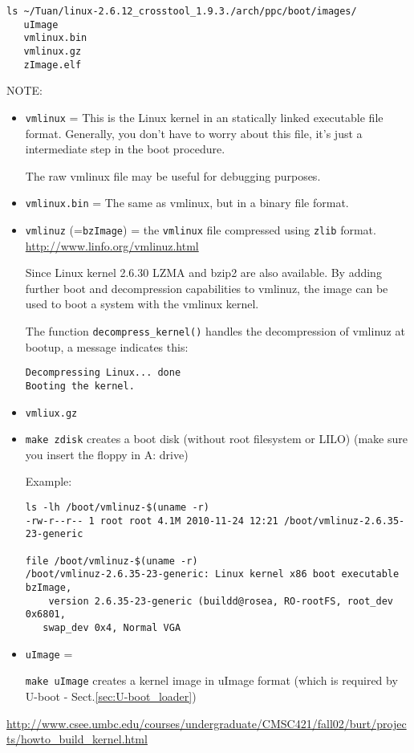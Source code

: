 \begin{verbatim}
ls ~/Tuan/linux-2.6.12_crosstool_1.9.3./arch/ppc/boot/images/
   uImage
   vmlinux.bin
   vmlinux.gz
   zImage.elf
\end{verbatim}


NOTE: 
\begin{itemize}
  \item \verb!vmlinux! = This is the Linux kernel in an statically linked
  executable file format. Generally, you don't have to worry about this file,
  it's just a intermediate step in the boot procedure.
  
  The raw vmlinux file may be useful for debugging purposes.
  
  \item \verb!vmlinux.bin! = The same as vmlinux, but in a binary file format.
  
  \item \verb!vmlinuz! (=\verb!bzImage!) = the \verb!vmlinux! file compressed
  using \verb!zlib! format. 
\url{http://www.linfo.org/vmlinuz.html}
  
  
  Since Linux kernel 2.6.30 LZMA and bzip2 are also available.
  By adding further boot and decompression capabilities to vmlinuz, the image
  can be used to boot a system with the vmlinux kernel. 
  
  The function \verb!decompress_kernel()! handles the decompression of vmlinuz
  at bootup, a message indicates this:
  \begin{verbatim}
Decompressing Linux... done
Booting the kernel.
  \end{verbatim}
  
  \item \verb!vmliux.gz!
  
  
  \item \verb!make zdisk! creates a boot disk (without root filesystem or LILO)
  (make sure you insert the floppy in A: drive)
  

Example: 
\begin{verbatim}
ls -lh /boot/vmlinuz-$(uname -r)
-rw-r--r-- 1 root root 4.1M 2010-11-24 12:21 /boot/vmlinuz-2.6.35-23-generic

file /boot/vmlinuz-$(uname -r)
/boot/vmlinuz-2.6.35-23-generic: Linux kernel x86 boot executable bzImage, 
    version 2.6.35-23-generic (buildd@rosea, RO-rootFS, root_dev 0x6801,
   swap_dev 0x4, Normal VGA
\end{verbatim}  
  
  \item \verb!uImage! = 
  
  \verb!make uImage! creates a kernel image in uImage
  format (which is required by U-boot - Sect.\ref{sec:U-boot_loader})
  
  
\end{itemize}
\url{http://www.csee.umbc.edu/courses/undergraduate/CMSC421/fall02/burt/projects/howto_build_kernel.html}

